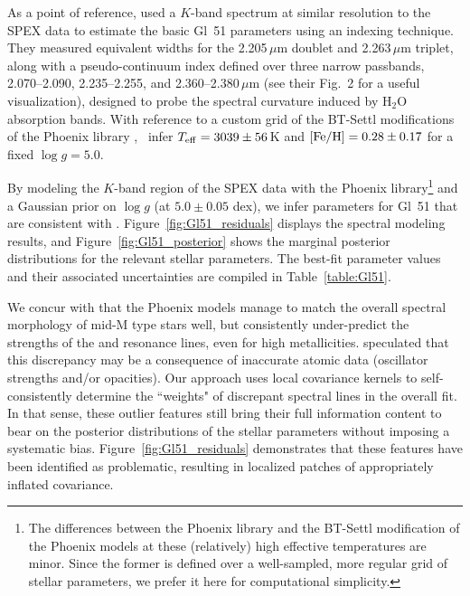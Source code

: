 \documentclass[iop,floatfix,numberedappendix,twocolappendix]{emulateapj}
\begin{document}
As a point of reference, \citet{rojas-ayala12} used a $K$-band spectrum at similar resolution to 
the SPEX data to estimate the basic Gl~51 parameters using an indexing technique.  They measured 
equivalent widths for the 2.205\,$\mu$m  doublet and 2.263\,$\mu$m  triplet, 
along with a pseudo-continuum index defined over three narrow passbands, 2.070--2.090, 
2.235--2.255, and 2.360--2.380\,$\mu$m (see their Fig.~2 for a useful visualization), designed to 
probe the spectral curvature induced by H$_2$O absorption bands.  With reference to a custom grid 
of the {\sc BT-Settl} modifications of the {\sc Phoenix} library \citep{allard12}, 
\citeauthor{rojas-ayala12}~infer $T_{\rm eff} = 3039\pm56$\,K and $[{\rm Fe/H}] = 0.28\pm0.17$ for 
a fixed $\log g = 5.0$.  

By modeling the $K$-band region of the SPEX data with the {\sc Phoenix} library\footnote{The 
differences between the \citet{husser13} {\sc Phoenix} library and the {\sc BT-Settl} modification 
of the {\sc Phoenix} models at these (relatively) high effective temperatures are minor.  Since the 
former is defined over a well-sampled, more regular grid of stellar parameters, we prefer it here 
for computational simplicity.} and a Gaussian prior on $\log g$ (at $5.0 \pm 0.05$ dex), we infer 
parameters for Gl~51 that are consistent with \citet{rojas-ayala12}.  
Figure~\ref{fig:Gl51_residuals} displays the spectral modeling results, and 
Figure~\ref{fig:Gl51_posterior} shows the marginal posterior distributions for the relevant stellar 
parameters.  The best-fit parameter values and their associated uncertainties are compiled in 
Table~\ref{table:Gl51}.

We concur with \citet{rojas-ayala12} that the {\sc Phoenix} models manage to match the overall 
spectral morphology of mid-M type stars well, but consistently under-predict the strengths of the 
 and  resonance lines, even for high metallicities.  \citet{rajpurohit10} 
speculated that this discrepancy may be a consequence of inaccurate atomic data (oscillator 
strengths and/or opacities).  Our approach uses local covariance kernels to self-consistently 
determine the ``weights" of discrepant spectral lines in the overall fit.  In that sense, these 
outlier features still bring their full information content to bear on the posterior distributions 
of the stellar parameters without imposing a systematic bias.  Figure~\ref{fig:Gl51_residuals} 
demonstrates that these features have been identified as problematic, resulting in localized 
patches of appropriately inflated covariance.
\end{document}
